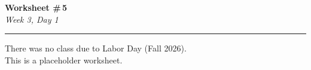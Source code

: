 \documentclass[11pt]{article}
\begin{document}
\noindent
{\LARGE \textbf{Worksheet \#\,5}} \\[0.3em]
{\large \textit{Week 3, Day 1}}

\vspace{1em}
\noindent\rule{\linewidth}{1pt}
\vspace{0.2em}

\vfill
\begin{center}
  {\large There was no class due to Labor Day (Fall 2026).}\\[0.6em]
  {\large This is a placeholder worksheet.}
\end{center}
\vfill
\end{document}
